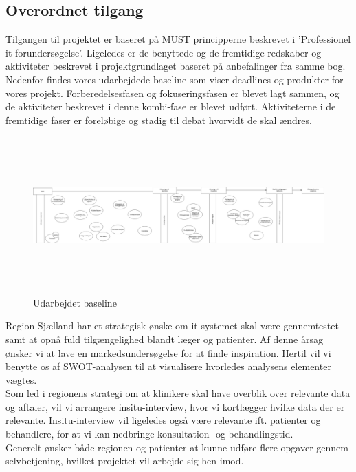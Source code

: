 \subsection{Overordnet tilgang}
Tilgangen til projektet er baseret på MUST principperne beskrevet i 'Professionel it-forundersøgelse'. Ligeledes er de benyttede og de fremtidige redskaber og aktiviteter beskrevet i projektgrundlaget baseret på anbefalinger fra samme bog.\\
Nedenfor findes vores udarbejdede baseline som viser deadlines og produkter for vores projekt. Forberedelsesfasen og fokuseringsfasen er blevet lagt sammen, og de aktiviteter beskrevet i denne kombi-fase er blevet udført. Aktiviteterne i de fremtidige faser er foreløbige og stadig til debat hvorvidt de skal ændres.
\begin{figure}[H]
	\hspace{-1.5cm}
	\includegraphics[width=1.2\textwidth, height=6cm]{Materials/Baseline}
	\caption{Udarbejdet baseline}
\end{figure}
Region Sjælland har et strategisk ønske om it systemet skal være gennemtestet samt at opnå fuld tilgængelighed blandt læger og patienter. Af denne årsag ønsker vi at lave en markedsundersøgelse for at finde inspiration. Hertil vil vi benytte os af SWOT-analysen til at visualisere hvorledes analysens elementer vægtes.\\
Som led i regionens strategi om at klinikere skal have overblik over relevante data og aftaler, vil vi arrangere insitu-interview, hvor vi kortlægger hvilke data der er relevante. Insitu-interview vil ligeledes også være relevante ift. patienter og behandlere, for at vi kan nedbringe konsultation- og behandlingstid.\\
Generelt ønsker både regionen og patienter at kunne udføre flere opgaver gennem selvbetjening, hvilket projektet vil arbejde sig hen imod.  

